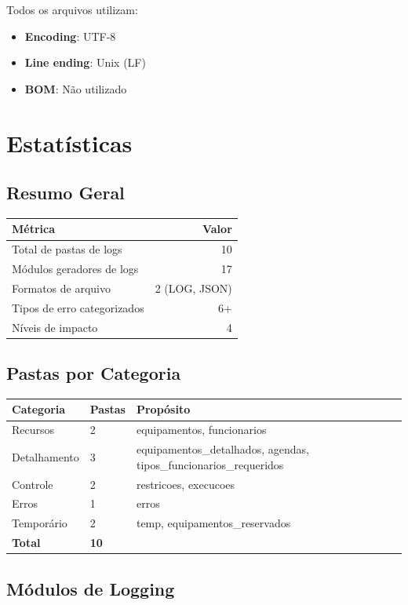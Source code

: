 \documentclass[11pt,a4paper]{article}
\begin{document}
Todos os arquivos utilizam:
\begin{itemize}
    \item \textbf{Encoding}: UTF-8
    \item \textbf{Line ending}: Unix (LF)
    \item \textbf{BOM}: Não utilizado
\end{itemize}

\newpage

\section{Estatísticas}

\subsection{Resumo Geral}

\begin{tabular}{lr}
\textbf{Métrica} & \textbf{Valor} \\
\hline
Total de pastas de logs & 10 \\
Módulos geradores de logs & 17 \\
Formatos de arquivo & 2 (LOG, JSON) \\
Tipos de erro categorizados & 6+ \\
Níveis de impacto & 4 \\
\hline
\end{tabular}

\subsection{Pastas por Categoria}

\begin{tabular}{lll}
\textbf{Categoria} & \textbf{Pastas} & \textbf{Propósito} \\
\hline
Recursos & 2 & equipamentos, funcionarios \\
Detalhamento & 3 & equipamentos\_detalhados, agendas, tipos\_funcionarios\_requeridos \\
Controle & 2 & restricoes, execucoes \\
Erros & 1 & erros \\
Temporário & 2 & temp, equipamentos\_reservados \\
\hline
\textbf{Total} & \textbf{10} & \\
\end{tabular}

\subsection{Módulos de Logging}
\end{document}
